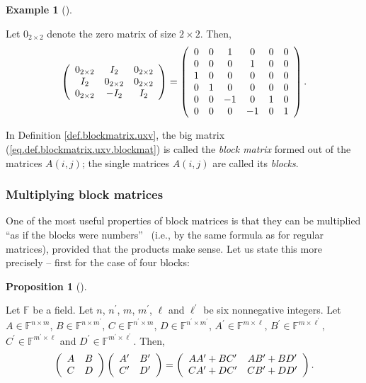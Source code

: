 \documentclass[numbers=enddot,12pt,final,onecolumn,notitlepage]{scrartcl}%
\numberwithin{exer}{subsection}
\theoremstyle{definition}
\newtheorem{prop}[theo]{Proposition}
\newenvironment{proposition}[1][]
{\begin{prop}[#1]\begin{leftbar}}
{\end{leftbar}\end{prop}}
\newtheorem{exam}[theo]{Example}
\newenvironment{example}[1][]
{\begin{exam}[#1]\begin{leftbar}}
{\end{leftbar}\end{exam}}
\begin{document}
\begin{example}
Let $0_{2\times2}$ denote the zero matrix of size $2\times2$. Then,%
\[
\left(
\begin{array}
[c]{ccc}%
0_{2\times2} & I_{2} & 0_{2\times2}\\
I_{2} & 0_{2\times2} & 0_{2\times2}\\
0_{2\times2} & -I_{2} & I_{2}%
\end{array}
\right)  =\left(
\begin{array}
[c]{cccccc}%
0 & 0 & 1 & 0 & 0 & 0\\
0 & 0 & 0 & 1 & 0 & 0\\
1 & 0 & 0 & 0 & 0 & 0\\
0 & 1 & 0 & 0 & 0 & 0\\
0 & 0 & -1 & 0 & 1 & 0\\
0 & 0 & 0 & -1 & 0 & 1
\end{array}
\right)  .
\]

\end{example}

In Definition \ref{def.blockmatrix.uxv}, the big matrix
(\ref{eq.def.blockmatrix.uxv.blockmat}) is called the \emph{block matrix}
formed out of the matrices $A\left(  i,j\right)  $; the single matrices
$A\left(  i,j\right)  $ are called its \emph{blocks}.

\subsubsection{Multiplying block matrices}

One of the most useful properties of block matrices is that they can be
multiplied \textquotedblleft as if the blocks were numbers\textquotedblright%
\ (i.e., by the same formula as for regular matrices), provided that the
products make sense. Let us state this more precisely -- first for the case of
four blocks:

\begin{proposition}
\label{prop.blockmatrix.mult-2x2}Let $\mathbb{F}$ be a field. Let $n$,
$n^{\prime}$, $m$, $m^{\prime}$, $\ell$ and $\ell^{\prime}$ be six nonnegative
integers. Let $A\in\mathbb{F}^{n\times m}$, $B\in\mathbb{F}^{n\times
m^{\prime}}$, $C\in\mathbb{F}^{n^{\prime}\times m}$, $D\in\mathbb{F}%
^{n^{\prime}\times m^{\prime}}$, $A^{\prime}\in\mathbb{F}^{m\times\ell}$,
$B^{\prime}\in\mathbb{F}^{m\times\ell^{\prime}}$, $C^{\prime}\in
\mathbb{F}^{m^{\prime}\times\ell}$ and $D^{\prime}\in\mathbb{F}^{m^{\prime
}\times\ell^{\prime}}$. Then,
\[
\left(
\begin{array}
[c]{cc}%
A & B\\
C & D
\end{array}
\right)  \left(
\begin{array}
[c]{cc}%
A^{\prime} & B^{\prime}\\
C^{\prime} & D^{\prime}%
\end{array}
\right)  =\left(
\begin{array}
[c]{cc}%
AA^{\prime}+BC^{\prime} & AB^{\prime}+BD^{\prime}\\
CA^{\prime}+DC^{\prime} & CB^{\prime}+DD^{\prime}%
\end{array}
\right)  .
\]

\end{proposition}
\end{document}
